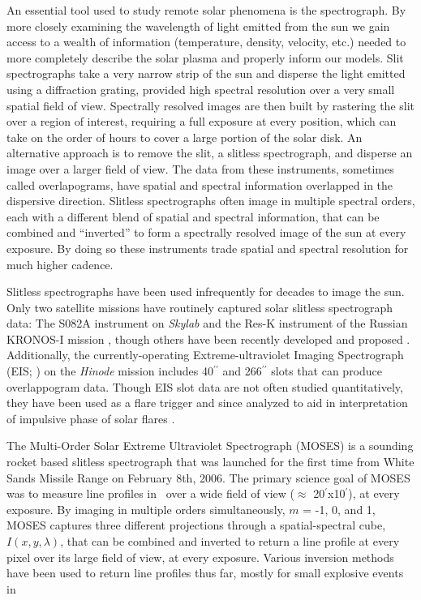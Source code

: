 	An essential tool used to study remote solar phenomena is the spectrograph.
	By more closely examining the wavelength of light emitted from the sun we gain access to a wealth of information (temperature, density, velocity, etc.) needed to more completely describe the solar plasma and properly inform our models.
	Slit spectrographs take a very narrow strip of the sun and disperse the light emitted using a diffraction grating, provided high spectral resolution over a very small spatial field of view.
	Spectrally resolved images are then built by rastering the slit over a region of interest, requiring a full exposure at every position, which can take on the order of hours to cover a large portion of the solar disk.
	An alternative approach is to remove the slit, a slitless spectrograph, and disperse an image over a larger field of view.
	The data from these instruments, sometimes called overlapograms, have spatial and spectral information overlapped in the dispersive direction.
	Slitless spectrographs often image in multiple spectral orders, each with a different blend of spatial and spectral information, that can be combined and ``inverted'' to form a spectrally resolved image of the sun at every exposure.
	By doing so these instruments trade spatial and spectral resolution for much higher cadence.

	Slitless spectrographs have been used infrequently for decades to image the sun.
	Only two satellite missions have routinely captured solar slitless spectrograph data: The S082A instrument on {\it Skylab} \citep{Tousey1973} and the Res-K instrument of the Russian KRONOS-I mission \citep{Zhitnik1998}, though others have been recently developed and proposed \citep{winebarger2019,golub2020}. 
	Additionally, the currently-operating Extreme-ultraviolet Imaging Spectrograph (EIS; \citet{culhane2007}) on the {\it Hinode} mission \citep{kosugi2007} includes 40$^{\prime\prime}$ and 266$^{\prime\prime}$ slots that can produce overlappogram data.
	Though EIS slot data are not often studied quantitatively, they have been used as a flare trigger and since analyzed to aid in interpretation of impulsive phase of solar flares \citep{harra2017,harra2020}.
 
	The Multi-Order Solar Extreme Ultraviolet Spectrograph (MOSES) is a sounding rocket based slitless spectrograph that was launched for the first time from White Sands Missile Range on February 8th, 2006.
	The primary science goal of MOSES was to measure line profiles in \heii \ over a wide field of view ($\approx$ 20$^{\prime}$x10$^{\prime}$), at every exposure.
	By imaging in multiple orders simultaneously, $m$ = -1, 0, and 1, MOSES captures three different projections through a spatial-spectral cube, $I(x,y,\lambda)$, that can be combined and inverted to return a line profile at every pixel over its large field of view, at every exposure.
	Various inversion methods have been used to return line profiles thus far, mostly for small explosive events in \heii\ \citep{Fox2011,Rust2019,Courrier2018}
	
